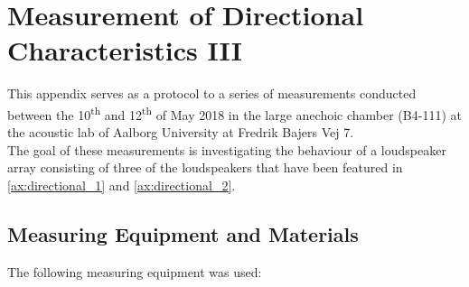 \chapter{Measurement of Directional Characteristics III}\label{ax:directional_3}
This appendix serves as a protocol to a series of measurements conducted between the 10\textsuperscript{th} and 12\textsuperscript{th} of May  2018 in the large anechoic chamber (B4-111) at the acoustic lab of Aalborg University at Fredrik Bajers Vej 7.\\
The goal of these measurements is investigating the behaviour of a loudspeaker array consisting of three of the loudspeakers that have been featured in \autoref{ax:directional_1} and \ref{ax:directional_2}.

\section*{Measuring Equipment and Materials}
The following measuring equipment was used:
